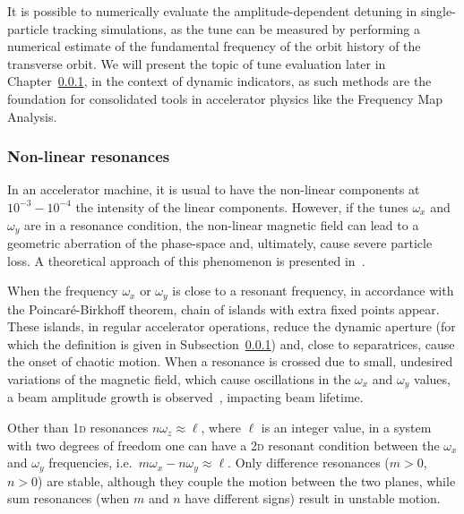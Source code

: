 It is possible to numerically evaluate the amplitude-dependent detuning in single-particle tracking simulations, as the tune can be measured by performing a numerical estimate of the fundamental frequency of the orbit history of the transverse orbit. We will present the topic of tune evaluation later in Chapter~\ref{}, in the context of dynamic indicators, as such methods are the foundation for consolidated tools in accelerator physics like the Frequency Map Analysis.

\subsubsection{Non-linear resonances}

In an accelerator machine, it is usual to have the non-linear components at $10^{-3} - 10^{-4}$ the intensity of the linear components. However, if the tunes $\omega_x$ and $\omega_y$ are in a resonance condition, the non-linear magnetic field can lead to a geometric aberration of the phase-space and, ultimately, cause severe particle loss. A theoretical approach of this phenomenon is presented in~\cite{}.

When the frequency $\omega_x$ or $\omega_y$ is close to a resonant frequency, in accordance with the Poincaré-Birkhoff theorem, chain of islands with extra fixed points appear. These islands, in regular accelerator operations, reduce the dynamic aperture (for which the definition is given in Subsection~\ref{}) and, close to separatrices, cause the onset of chaotic motion. When a resonance is crossed due to small, undesired variations of the magnetic field, which cause oscillations in the $\omega_x$ and $\omega_y$ values, a beam amplitude growth is observed~\cite{Guignard:185921}, impacting beam lifetime.

Other than 1\textsc{d} resonances $n\omega_z \approx \ell$, where $\ell$ is an integer value, in a system with two degrees of freedom one can have a 2\textsc{d} resonant condition between the $\omega_x$ and $\omega_y$ frequencies, i.e.\ $m\omega_x-n\omega_y\approx \ell$. Only difference resonances ($m>0$, $n>0$) are stable, although they couple the motion between the two planes, while sum resonances (when $m$ and $n$ have different signs) result in unstable motion.

